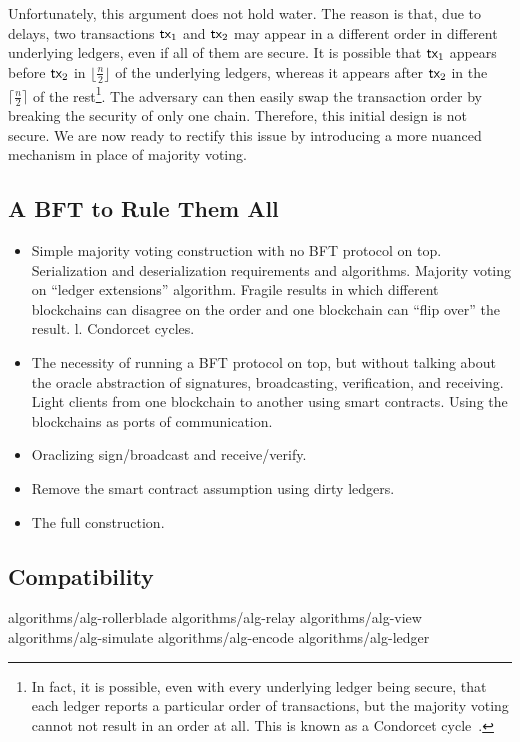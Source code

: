 Unfortunately, this argument does not hold water. The reason is that, due to
delays, two transactions $\textsf{tx}_1$ and $\textsf{tx}_2$ may appear in a different order
in different underlying ledgers, even if all of them are secure. It is possible
that $\textsf{tx}_1$ appears before $\textsf{tx}_2$ in $\lfloor \frac{n}{2} \rfloor$ of the
underlying ledgers, whereas it appears after $\textsf{tx}_2$ in the $\lceil \frac{n}{2} \rceil$
of the rest\footnote{In fact, it is possible, even with every underlying ledger being
secure, that each ledger reports a particular order of transactions, but the majority voting
cannot not result in an order at all. This is known as a Condorcet cycle~\cite{condorcet}.}.
The adversary can then easily swap the transaction order by
breaking the security of only one chain. Therefore, this initial design
is not secure. We are now ready to rectify this issue by introducing a more
nuanced mechanism in place of majority voting.

\subsection{A BFT to Rule Them All}\label{sec:construction-bft}

\begin{itemize}
  \item Simple majority voting construction with no BFT protocol on top. Serialization and deserialization requirements and algorithms. Majority voting on ``ledger extensions'' algorithm. Fragile results in which different blockchains can disagree on the order and one blockchain can ``flip over'' the result. l. Condorcet cycles.
  \item The necessity of running a BFT protocol on top, but without talking about the oracle abstraction of signatures, broadcasting, verification, and receiving. Light clients from one blockchain to another using smart contracts. Using the blockchains as ports of communication.
  \item Oraclizing sign/broadcast and receive/verify.
  \item Remove the smart contract assumption using dirty ledgers.
  \item The full construction.
\end{itemize}

\subsection{Compatibility}\label{sec:compatibility}

{algorithms/alg-rollerblade}
{algorithms/alg-relay}
{algorithms/alg-view}
{algorithms/alg-simulate}
{algorithms/alg-encode}
{algorithms/alg-ledger}

